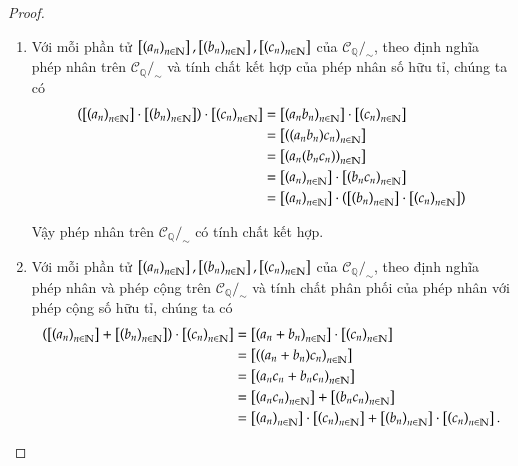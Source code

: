 \begin{proof}
    \begin{enumerate}[label=(\roman*)]
        \item Với mỗi phần tử $\left[{\left({a_{n}}\right)}_{{n}\in\mathbb{N}}\right], \left[{\left({b_{n}}\right)}_{{n}\in\mathbb{N}}\right], \left[{\left({c_{n}}\right)}_{{n}\in\mathbb{N}}\right]$ của $\mathscr{C}_{\mathbb{Q}}/_{\sim}$, theo định nghĩa phép nhân trên $\mathscr{C}_{\mathbb{Q}}/_{\sim}$ và tính chất kết hợp của phép nhân số hữu tỉ, chúng ta có
              \begin{align*}
                  \left(\left[{\left({a_{n}}\right)}_{{n}\in\mathbb{N}}\right] \cdot \left[{\left({b_{n}}\right)}_{{n}\in\mathbb{N}}\right]\right) \cdot \left[{\left({c_{n}}\right)}_{{n}\in\mathbb{N}}\right] & = \left[{\left({a_{n}b_{n}}\right)}_{{n}\in\mathbb{N}}\right] \cdot \left[{\left({c_{n}}\right)}_{{n}\in\mathbb{N}}\right]                                 \\
                                                                                                 & = \left[{\left({(a_{n}b_{n})c_{n}}\right)}_{{n}\in\mathbb{N}}\right]                                                  \\
                                                                                                 & = \left[{\left({a_{n}(b_{n}c_{n})}\right)}_{{n}\in\mathbb{N}}\right]                                                  \\
                                                                                                 & = \left[{\left({a_{n}}\right)}_{{n}\in\mathbb{N}}\right] \cdot \left[{\left({b_{n}c_{n}}\right)}_{{n}\in\mathbb{N}}\right]                                 \\
                                                                                                 & = \left[{\left({a_{n}}\right)}_{{n}\in\mathbb{N}}\right] \cdot \left(\left[{\left({b_{n}}\right)}_{{n}\in\mathbb{N}}\right] \cdot \left[{\left({c_{n}}\right)}_{{n}\in\mathbb{N}}\right]\right)
              \end{align*}

              Vậy phép nhân trên $\mathscr{C}_{\mathbb{Q}}/_{\sim}$ có tính chất kết hợp.
        \item Với mỗi phần tử $\left[{\left({a_{n}}\right)}_{{n}\in\mathbb{N}}\right], \left[{\left({b_{n}}\right)}_{{n}\in\mathbb{N}}\right], \left[{\left({c_{n}}\right)}_{{n}\in\mathbb{N}}\right]$ của $\mathscr{C}_{\mathbb{Q}}/_{\sim}$, theo định nghĩa phép nhân và phép cộng trên $\mathscr{C}_{\mathbb{Q}}/_{\sim}$ và tính chất phân phối của phép nhân với phép cộng số hữu tỉ, chúng ta có
              \begin{align*}
                  \left(\left[{\left({a_{n}}\right)}_{{n}\in\mathbb{N}}\right] + \left[{\left({b_{n}}\right)}_{{n}\in\mathbb{N}}\right]\right) \cdot \left[{\left({c_{n}}\right)}_{{n}\in\mathbb{N}}\right] & = \left[{\left({a_{n} + b_{n}}\right)}_{{n}\in\mathbb{N}}\right] \cdot \left[{\left({c_{n}}\right)}_{{n}\in\mathbb{N}}\right]                                      \\
                                                                                             & = \left[{\left({(a_{n}+ b_{n})c_{n}}\right)}_{{n}\in\mathbb{N}}\right]                                                        \\
                                                                                             & = \left[{\left({a_{n}c_{n} + b_{n}c_{n}}\right)}_{{n}\in\mathbb{N}}\right]                                                    \\
                                                                                             & = \left[{\left({a_{n}c_{n}}\right)}_{{n}\in\mathbb{N}}\right] + \left[{\left({b_{n}c_{n}}\right)}_{{n}\in\mathbb{N}}\right]                                        \\
                                                                                             & = \left[{\left({a_{n}}\right)}_{{n}\in\mathbb{N}}\right] \cdot \left[{\left({c_{n}}\right)}_{{n}\in\mathbb{N}}\right] + \left[{\left({b_{n}}\right)}_{{n}\in\mathbb{N}}\right] \cdot \left[{\left({c_{n}}\right)}_{{n}\in\mathbb{N}}\right].
              \end{align*}


\end{enumerate}
\end{proof}

